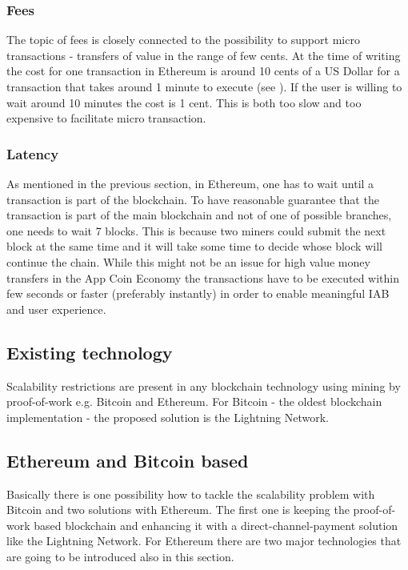 \subsubsection{Fees}

The topic of fees is closely connected to the possibility to support micro transactions - transfers of value in the range of few cents. At the time of writing the cost for one transaction in Ethereum is around 10 cents of a US Dollar for a transaction that takes around 1 minute to execute (see \cite{ethgasstation}). If the user is willing to wait around 10 minutes the cost is 1 cent. This is both too slow and too expensive to facilitate micro transaction.

\subsubsection{Latency}
As mentioned in the previous section, in Ethereum, one has to wait until a transaction is part of the blockchain. To have reasonable guarantee that the transaction is part of the main blockchain and not of one of possible branches, one needs to wait 7 blocks. This is because two miners could submit the next block at the same time and it will take some time to decide whose block will continue the chain. While this might not be an issue for high value money transfers in the App Coin Economy the transactions have to be executed within few seconds or faster (preferably instantly) in order to enable meaningful IAB and user experience.

\subsection{Existing technology}
Scalability restrictions are present in any blockchain technology using mining by proof-of-work e.g. Bitcoin and Ethereum. For Bitcoin - the oldest blockchain implementation - the proposed solution is the Lightning Network. %


\subsection{Ethereum and Bitcoin based}

Basically there is one possibility how to tackle the scalability problem with Bitcoin and two solutions with Ethereum. The first one is keeping the proof-of-work based blockchain and enhancing it with a direct-channel-payment solution like the Lightning Network. For Ethereum there are two major technologies that are going to be introduced also in this section.

